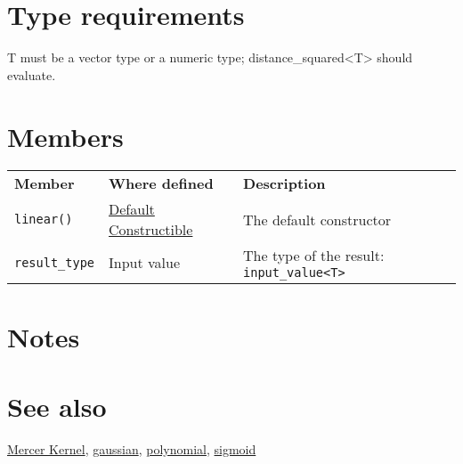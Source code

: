 \documentclass{article}
\begin{document}
\section*{Type requirements}

T must be a vector type or a numeric type; distance_squared<T> should evaluate.


\section*{Members}

\begin{tabular}{lll}
\textbf{Member} & \textbf{Where defined} & \textbf{Description} \\ 
\texttt{linear()} & \href{http://www.sgi.com/tech/stl/DefaultConstructible.html}{Default Constructible} & The default constructor \\
\texttt{result_type} & Input value & The type of the result: \texttt{input_value<T>} \\
\end{tabular}

\section*{Notes}

\section*{See also}

\href{research/kml/documentation/mercer_kernel.html}{Mercer Kernel},
\href{research/kml/documentation/gaussian.html}{gaussian},
\href{research/kml/documentation/polynomial.html}{polynomial},
\href{research/kml/documentation/sigmoid.html}{sigmoid}



\end{document}
